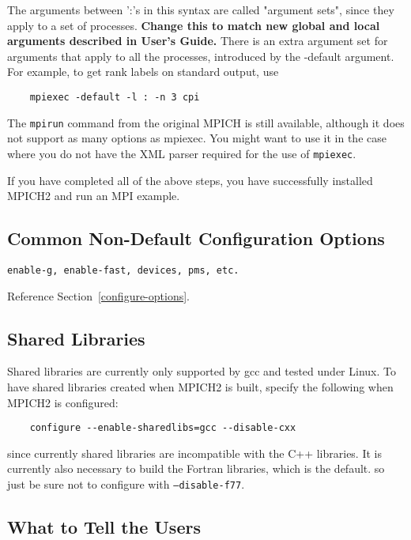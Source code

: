 \documentclass[dvipdfm,11pt]{article}
\begin{document}
\begin{enumerate}
The arguments between ':'s in this syntax are called "argument sets",
since they apply to a set of processes.  \textbf{Change this to match
new global and local arguments described in User's Guide.}  There is
an extra argument set for arguments that apply to all the processes,
introduced by the -default argument.  For example, to get rank labels on
standard output, use
\begin{verbatim}
    mpiexec -default -l : -n 3 cpi
\end{verbatim}
The \texttt{mpirun} command from the original MPICH is still available,
although it does not support as many options as mpiexec.  You might
want to use it in the case where you do not have the XML parser
required for the use of \texttt{mpiexec}.
\end{enumerate}

If you have completed all of the above steps, you have successfully
installed MPICH2 and run an MPI example.  


\subsection{Common Non-Default Configuration Options}
\label{sec:non-default}

\begin{verbatim}
enable-g, enable-fast, devices, pms, etc.
\end{verbatim}
Reference Section~\ref{configure-options}.


\subsection{Shared Libraries}
\label{sec:shared-libraries}

Shared libraries are currently only supported by gcc and tested under
Linux.  To have shared libraries created when MPICH2 is built, specify
the following when MPICH2 is configured:
\begin{verbatim}
    configure --enable-sharedlibs=gcc --disable-cxx
\end{verbatim}
since currently shared libraries are incompatible with the C++
libraries.  It is currently also necessary to build the Fortran
libraries, which is the default.  so just be sure not to configure with 
\texttt{--disable-f77}.

\subsection{What to Tell the Users}
\label{sec:telling}
\end{document}
